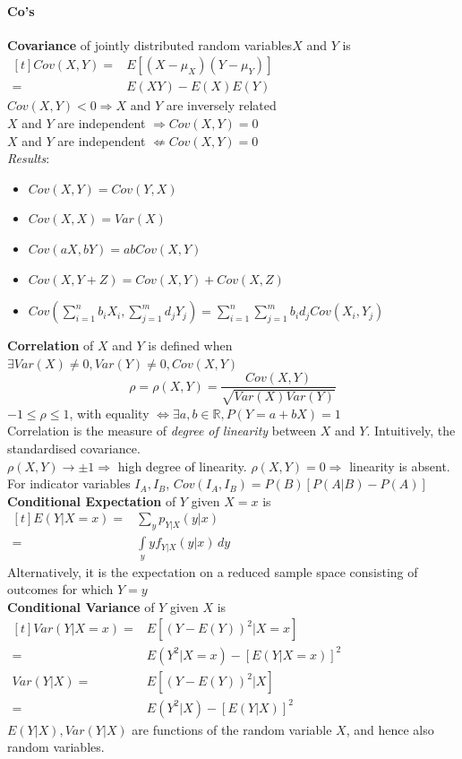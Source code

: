 \paragraph{Co's}
\textbf{Covariance} of jointly distributed random variables$X$ and $Y$ is\\
\(\begin{aligned}[t]Cov(X,Y)=&E[(X-\mu_X)(Y-\mu_Y)]\\
=&E(XY)-E(X)E(Y)\end{aligned}\)\\
$Cov(X,Y)<0\Rightarrow X$ and $Y$ are inversely related\\
$X$ and $Y$ are independent $\Rightarrow Cov(X,Y)=0$\\
$X$ and $Y$ are independent $\nLeftarrow Cov(X,Y)=0$\\
\emph{Results}:
\begin{itemize}
  \item $Cov(X,Y)=Cov(Y,X)$
  \item $Cov(X,X)=Var(X)$
  \item $Cov(aX,bY)=abCov(X,Y)$
  \item $Cov(X, Y+Z)=Cov(X,Y)+Cov(X,Z)$
  \item $Cov\left(\sum\limits_{i=1}^{n}b_{i}X_i,
    \sum\limits_{j=1}^{m}d_{j}Y_j\right)=\sum\limits_{i=1}^{n}\sum\limits_{j=1}^{m}b_{i}d_{j}Cov(X_i,
    Y_j)$
\end{itemize}
\textbf{Correlation} of $X$ and $Y$ is defined when \\
$\exists Var(X)\neq 0, Var(Y)\neq 0, Cov(X,Y)$
\[\rho=\rho(X,Y)=\frac{Cov(X,Y)}{\sqrt{Var(X)Var(Y)}}\]
$-1\le\rho\le1$, with equality $\iff \exists a,b\in\mathbb{R}, P(Y=a+bX)=1$\\
Correlation is the measure of \emph{degree of linearity} between $X$ and $Y$.
Intuitively, the standardised covariance.\\
$\rho(X,Y)\to\pm1\Rightarrow$ high degree of linearity.
$\rho(X,Y)=0\Rightarrow$ linearity is absent.\\
For indicator variables $I_A,I_B$, $Cov(I_A,I_B)=P(B)[P(A|B)-P(A)]$\\
\textbf{Conditional Expectation} of $Y$ given $X=x$ is\\
\(\begin{aligned}[t]
  E(Y|X=x)=&\sum\limits_{y}p_{Y|X}(y|x)\\
  =&\int\limits_{y}yf_{Y|X}(y|x)\,dy
\end{aligned}\)\\
Alternatively, it is the expectation on a reduced sample space consisting of
outcomes for which $Y=y$\\
\textbf{Conditional Variance} of $Y$ given $X$ is\\
\(\begin{aligned}[t]
  Var(Y|X=x)=&E[{(Y-E(Y))}^2|X=x]\\
            =&E(Y^{2}|X=x)-{[E(Y|X=x)]}^2\\
    Var(Y|X)=&E[{(Y-E(Y))}^2|X]\\
            =&E(Y^{2}|X)-{[E(Y|X)]}^2
\end{aligned}\)
$E(Y|X), Var(Y|X)$ are functions of the random variable $X$, and hence also
random variables.

